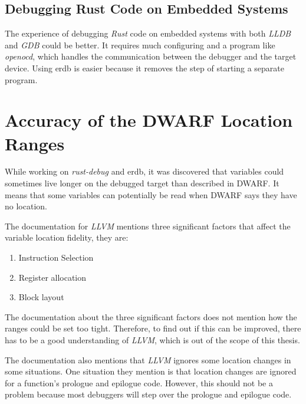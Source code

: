 \subsection{Debugging Rust Code on Embedded Systems}
The experience of debugging \emph{Rust} code on embedded systems with both \emph{LLDB} and \emph{GDB} could be better.
It requires much configuring and a program like \emph{openocd}, which handles the communication between the debugger and the target device.
Using \gls{erdb} is easier because it removes the step of starting a separate program.



\section{Accuracy of the DWARF Location Ranges}\label{section:loc-ranges}
While working on \emph{rust-debug} and \gls{erdb}, it was discovered that variables could sometimes live longer on the debugged target than described in \gls{DWARF}.
It means that some variables can potentially be read when \gls{DWARF} says they have no location.


The documentation for \emph{LLVM} \cite{llvm-dbs} mentions three significant factors that affect the variable location fidelity, they are:

\begin{enumerate}
  \item Instruction Selection
  \item Register allocation
  \item Block layout
\end{enumerate}

The documentation about the three significant factors does not mention how the ranges could be set too tight.
Therefore, to find out if this can be improved, there has to be a good understanding of \emph{LLVM}, which is out of the scope of this thesis.


The documentation also mentions that \emph{LLVM} ignores some location changes in some situations.
One situation they mention is that location changes are ignored for a function's prologue and epilogue code.
However, this should not be a problem because most debuggers will step over the prologue and epilogue code.

